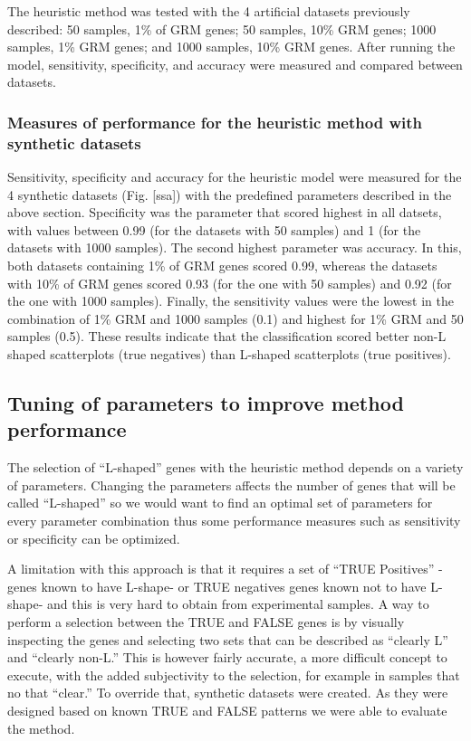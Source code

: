 \documentclass[10pt,letterpaper]{article}
\begin{document}
The heuristic method was tested with the 4 artificial datasets
previously described: 50 samples, 1\% of GRM genes; 50 samples, 10\% GRM
genes; 1000 samples, 1\% GRM genes; and 1000 samples, 10\% GRM genes.
After running the model, sensitivity, specificity, and accuracy were
measured and compared between datasets.

\hypertarget{measures-of-performance-for-the-heuristic-method-with-synthetic-datasets}{%
\subsubsection{Measures of performance for the heuristic method with
synthetic
datasets}\label{measures-of-performance-for-the-heuristic-method-with-synthetic-datasets}}

Sensitivity, specificity and accuracy for the heuristic model were
measured for the 4 synthetic datasets (Fig. {[}ssa{]}) with the
predefined parameters described in the above section. Specificity was
the parameter that scored highest in all datsets, with values between
0.99 (for the datasets with 50 samples) and 1 (for the datasets with
1000 samples). The second highest parameter was accuracy. In this, both
datasets containing 1\% of GRM genes scored 0.99, whereas the datasets
with 10\% of GRM genes scored 0.93 (for the one with 50 samples) and
0.92 (for the one with 1000 samples). Finally, the sensitivity values
were the lowest in the combination of 1\% GRM and 1000 samples (0.1) and
highest for 1\% GRM and 50 samples (0.5). These results indicate that
the classification scored better non-L shaped scatterplots (true
negatives) than L-shaped scatterplots (true positives).

\hypertarget{tuning-of-parameters-to-improve-method-performance}{%
\subsection{Tuning of parameters to improve method
performance}\label{tuning-of-parameters-to-improve-method-performance}}

The selection of ``L-shaped'' genes with the heuristic method depends on
a variety of parameters. Changing the parameters affects the number of
genes that will be called ``L-shaped'' so we would want to find an
optimal set of parameters for every parameter combination thus some
performance measures such as sensitivity or specificity can be
optimized.

A limitation with this approach is that it requires a set of ``TRUE
Positives'' -genes known to have L-shape- or TRUE negatives genes known
not to have L-shape- and this is very hard to obtain from experimental
samples. A way to perform a selection between the TRUE and FALSE genes
is by visually inspecting the genes and selecting two sets that can be
described as ``clearly L'' and ``clearly non-L.'' This is however fairly
accurate, a more difficult concept to execute, with the added
subjectivity to the selection, for example in samples that no that
``clear.'' To override that, synthetic datasets were created. As they
were designed based on known TRUE and FALSE patterns we were able to
evaluate the method.
\end{document}

